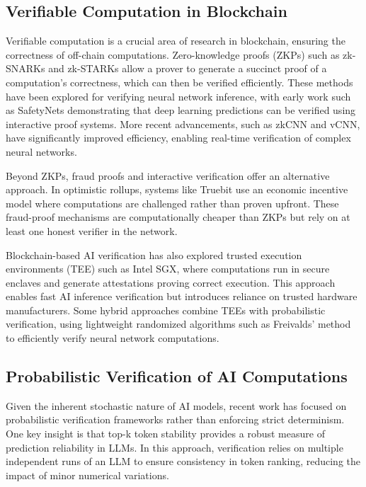 \documentclass{article}
\begin{document}
\subsection{Verifiable Computation in Blockchain}

Verifiable computation is a crucial area of research in blockchain, ensuring the correctness of off-chain computations. Zero-knowledge proofs (ZKPs) such as zk-SNARKs and zk-STARKs allow a prover to generate a succinct proof of a computation’s correctness, which can then be verified efficiently. These methods have been explored for verifying neural network inference, with early work such as SafetyNets demonstrating that deep learning predictions can be verified using interactive proof systems. More recent advancements, such as zkCNN and vCNN, have significantly improved efficiency, enabling real-time verification of complex neural networks.

Beyond ZKPs, fraud proofs and interactive verification offer an alternative approach. In optimistic rollups, systems like Truebit use an economic incentive model where computations are challenged rather than proven upfront. These fraud-proof mechanisms are computationally cheaper than ZKPs but rely on at least one honest verifier in the network.

Blockchain-based AI verification has also explored trusted execution environments (TEE) such as Intel SGX, where computations run in secure enclaves and generate attestations proving correct execution. This approach enables fast AI inference verification but introduces reliance on trusted hardware manufacturers. Some hybrid approaches combine TEEs with probabilistic verification, using lightweight randomized algorithms such as Freivalds’ method to efficiently verify neural network computations.

\subsection{Probabilistic Verification of AI Computations}

Given the inherent stochastic nature of AI models, recent work has focused on probabilistic verification frameworks rather than enforcing strict determinism. One key insight is that top-k token stability provides a robust measure of prediction reliability in LLMs. In this approach, verification relies on multiple independent runs of an LLM to ensure consistency in token ranking, reducing the impact of minor numerical variations.
\end{document}

